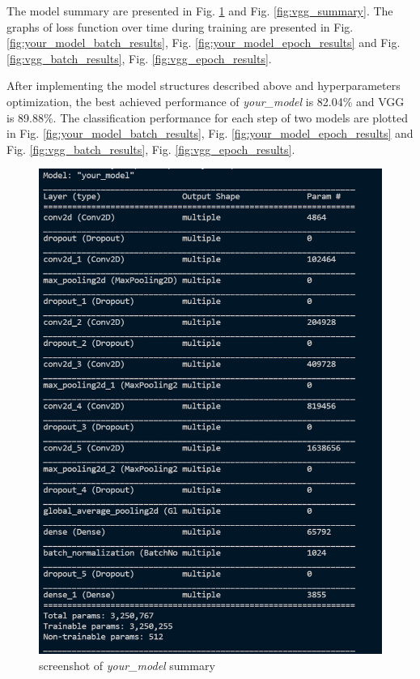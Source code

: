 The model summary are presented in Fig. \ref{fig:your_model_summary} and Fig. \ref{fig:vgg_summary}. The graphs of loss function over time during training are presented in Fig. \ref{fig:your_model_batch_results}, Fig. \ref{fig:your_model_epoch_results} and Fig. \ref{fig:vgg_batch_results}, Fig. \ref{fig:vgg_epoch_results}.

After implementing the model structures described above and hyperparameters optimization, the best achieved performance of \emph{your\_model} is 82.04\% and VGG is 89.88\%. The classification performance for each step of two models are plotted in Fig. \ref{fig:your_model_batch_results}, Fig. \ref{fig:your_model_epoch_results} and Fig. \ref{fig:vgg_batch_results}, Fig. \ref{fig:vgg_epoch_results}.

\begin{figure}[htbp]
    \centering
    \includegraphics[scale=0.6]{your_model_summary.png}
    \caption{screenshot of \emph{your\_model} summary}
    \label{fig:your_model_summary}
\end{figure}

